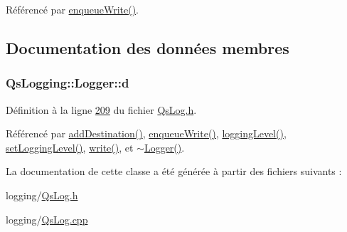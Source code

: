 Référencé par \hyperlink{classQsLogging_1_1Logger_acd6d5d16d6e111eaa960807d75549bf9}{enqueue\-Write()}.



\subsection{Documentation des données membres}
\hypertarget{classQsLogging_1_1Logger_aab634416e14e5cb4ca3193dc5a9924fa}{
\subsubsection[{d}]{\setlength{\rightskip}{0pt plus 5cm}Qs\-Logging\-::\-Logger\-::d\hspace{0.3cm}{\ttfamily [private]}}}\label{classQsLogging_1_1Logger_aab634416e14e5cb4ca3193dc5a9924fa}


Définition à la ligne \hyperlink{QsLog_8h_source_l00209}{209} du fichier \hyperlink{QsLog_8h_source}{Qs\-Log.\-h}.



Référencé par \hyperlink{classQsLogging_1_1Logger_a76a32c839e837547b14bc5e523b4aa45}{add\-Destination()}, \hyperlink{classQsLogging_1_1Logger_acd6d5d16d6e111eaa960807d75549bf9}{enqueue\-Write()}, \hyperlink{classQsLogging_1_1Logger_a5e2b29cf6cd066f1e64eaa4db7373458}{logging\-Level()}, \hyperlink{classQsLogging_1_1Logger_aa34d1a0d83e180f15e23a03f9de872c6}{set\-Logging\-Level()}, \hyperlink{classQsLogging_1_1Logger_ab9789bba5f1644a3b3b51606533aa20f}{write()}, et \hyperlink{classQsLogging_1_1Logger_a0947daaf6db4f83ba6e5fe155fa84e1f}{$\sim$\-Logger()}.



La documentation de cette classe a été générée à partir des fichiers suivants \-:\begin{DoxyCompactItemize}
\item 
logging/\hyperlink{QsLog_8h}{Qs\-Log.\-h}\item 
logging/\hyperlink{QsLog_8cpp}{Qs\-Log.\-cpp}\end{DoxyCompactItemize}

